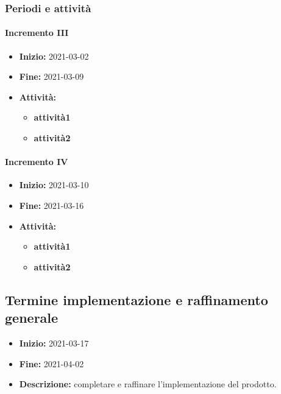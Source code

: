 \subsubsection{Periodi e attività}

\paragraph[Incremento III]{Incremento III}
\begin{itemize}
    \item [] \textbf{Inizio:} 2021-03-02
    \item [] \textbf{Fine:} 2021-03-09
    \item [] \textbf{Attività:}
          \begin{itemize}
              \item \textbf{attività1}
              \item \textbf{attività2}
          \end{itemize}
\end{itemize}

\paragraph[Incremento IV]{Incremento IV}
\begin{itemize}
    \item [] \textbf{Inizio:} 2021-03-10
    \item [] \textbf{Fine:} 2021-03-16
    \item [] \textbf{Attività:}
          \begin{itemize}
              \item \textbf{attività1}
              \item \textbf{attività2}
          \end{itemize}
\end{itemize}


\subsection{Termine implementazione e raffinamento generale} \label{_pianificazioneTermineImplementazione}
\begin{itemize}
    \item [] \textbf{Inizio:} 2021-03-17
    \item [] \textbf{Fine:} 2021-04-02
    \item [] \textbf{Descrizione:} completare e raffinare l'implementazione del prodotto.
\end{itemize}

